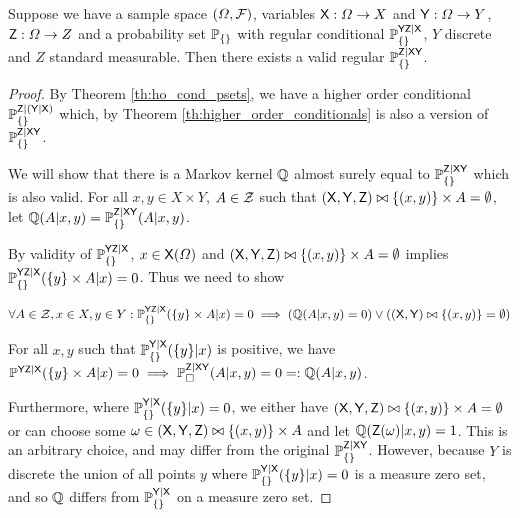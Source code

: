 \begin{theorem}
Suppose we have a sample space $(\Omega,\mathcal{F})$, variables $\mathsf{X}:\Omega\to X$ and $\mathsf{Y}:\Omega\to Y$, $\mathsf{Z}:\Omega\to Z$ and a probability set $\mathbb{P}_{\{\}}$ with regular conditional $\mathbb{P}_{\{\}}^{\mathsf{YZ}|\mathsf{X}}$, $Y$ discrete and $Z$ standard measurable. Then there exists a valid regular $\mathbb{P}_{\{\}}^{\mathsf{Z}|\mathsf{XY}}$.
\end{theorem}

\begin{proof}
By Theorem \ref{th:ho_cond_psets}, we have a higher order conditional $\mathbb{P}_{\{\}}^{\mathsf{Z}|(\mathsf{Y}|\mathsf{X})}$ which, by Theorem \ref{th:higher_order_conditionals} is also a version of $\mathbb{P}_{\{\}}^{\mathsf{Z}|\mathsf{XY}}$.

We will show that there is a Markov kernel $\mathbb{Q}$ almost surely equal to $\mathbb{P}_{\{\}}^{\mathsf{Z}|\mathsf{XY}}$ which is also valid. For all $x,y\in X\times Y$, $A\in\mathcal{Z}$ such that $(\mathsf{X},\mathsf{Y},\mathsf{Z})\bowtie\{(x,y)\}\times A=\emptyset$, let $\mathbb{Q}(A|x,y)=\mathbb{P}_{\{\}}^{\mathsf{Z}|\mathsf{XY}}(A|x,y)$.

By validity of $\mathbb{P}_{\{\}}^{\mathsf{YZ}|\mathsf{X}}$, $x\in \mathsf{X}(\Omega)$ and $(\mathsf{X},\mathsf{Y},\mathsf{Z})\bowtie\{(x,y)\}\times A=\emptyset$ implies $\mathbb{P}_{\{\}}^{\mathsf{YZ}|\mathsf{X}}(\{y\}\times A|x)=0$. Thus we need to show

\begin{align}
    \forall A\in \mathcal{Z}, x\in X, y\in Y: \mathbb{P}_{\{\}}^{\mathsf{YZ}|\mathsf{X}}(\{y\}\times A|x)=0 \implies \left(\mathbb{Q}(A|x,y) = 0\right) \lor \left((\mathsf{X},\mathsf{Y})\bowtie \{(x,y)\} = \emptyset\right)
\end{align}

For all $x,y$ such that $\mathbb{P}_{\{\}}^{\mathsf{Y}|\mathsf{X}}(\{y\}|x)$ is positive, we have $\mathbb{P}^{\mathsf{YZ}|\mathsf{X}}(\{y\}\times A|x)=0\implies \mathbb{P}_\square^{\mathsf{Z}|\mathsf{XY}}(A|x,y)=0=:\mathbb{Q}(A|x,y)$.

Furthermore, where $\mathbb{P}_{\{\}}^{\mathsf{Y}|\mathsf{X}}(\{y\}|x)=0$, we either have $(\mathsf{X},\mathsf{Y},\mathsf{Z})\bowtie\{(x,y)\}\times A= \emptyset$ or can choose some $\omega\in (\mathsf{X},\mathsf{Y},\mathsf{Z})\bowtie\{(x,y)\}\times A$ and let $\mathbb{Q}(\mathsf{Z}(\omega)|x,y) = 1$. This is an arbitrary choice, and may differ from the original $\mathbb{P}_{\{\}}^{\mathsf{Z}|\mathsf{XY}}$. However, because $Y$ is discrete the union of all points $y$ where $\mathbb{P}_{\{\}}^{\mathsf{Y}|\mathsf{X}}(\{y\}|x)=0$ is a measure zero set, and so $\mathbb{Q}$ differs from $\mathbb{P}_{\{\}}^{\mathsf{Y}|\mathsf{X}}$ on a measure zero set.
\end{proof}


